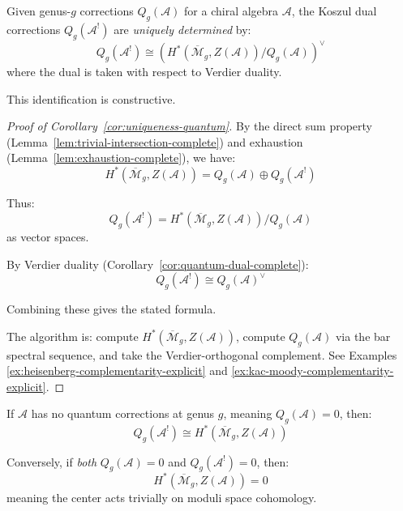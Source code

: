 \begin{corollary}
\label{cor:uniqueness-quantum}
Given genus-$g$ corrections $Q_g(\mathcal{A})$ for a chiral algebra $\mathcal{A}$, the 
Koszul dual corrections $Q_g(\mathcal{A}^!)$ are \emph{uniquely determined} by:
\begin{equation}
Q_g(\mathcal{A}^!) \cong \left(H^*(\overline{\mathcal{M}}_g, Z(\mathcal{A})) / Q_g(
\mathcal{A})\right)^\vee
\end{equation}
where the dual is taken with respect to Verdier duality.

This identification is constructive.
\end{corollary}

\begin{proof}[Proof of Corollary~\ref{cor:uniqueness-quantum}]
By the direct sum property (Lemma~\ref{lem:trivial-intersection-complete}) and exhaustion 
(Lemma~\ref{lem:exhaustion-complete}), we have:
\begin{equation}
H^*(\overline{\mathcal{M}}_g, Z(\mathcal{A})) = Q_g(\mathcal{A}) \oplus Q_g(\mathcal{A}^!)
\end{equation}

Thus:
\begin{equation}
Q_g(\mathcal{A}^!) = H^*(\overline{\mathcal{M}}_g, Z(\mathcal{A})) / Q_g(\mathcal{A})
\end{equation}
as vector spaces.

By Verdier duality (Corollary~\ref{cor:quantum-dual-complete}):
\begin{equation}
Q_g(\mathcal{A}^!) \cong Q_g(\mathcal{A})^\vee
\end{equation}

Combining these gives the stated formula.

The algorithm is: compute $H^*(\overline{\mathcal{M}}_g, Z(\mathcal{A}))$, compute $Q_g(\mathcal{A})$ via the bar spectral sequence, and take the Verdier-orthogonal complement.
See Examples \ref{ex:heisenberg-complementarity-explicit} and \ref{ex:kac-moody-complementarity-explicit}.
\end{proof}

\begin{corollary}
\label{cor:vanishing-quantum}
If $\mathcal{A}$ has no quantum corrections at genus $g$, meaning $Q_g(\mathcal{A}) = 0$, 
then:
\begin{equation}
Q_g(\mathcal{A}^!) \cong H^*(\overline{\mathcal{M}}_g, Z(\mathcal{A}))
\end{equation}

Conversely, if \emph{both} $Q_g(\mathcal{A}) = 0$ and $Q_g(\mathcal{A}^!) = 0$, then:
\begin{equation}
H^*(\overline{\mathcal{M}}_g, Z(\mathcal{A})) = 0
\end{equation}
meaning the center acts trivially on moduli space cohomology.
\end{corollary}

